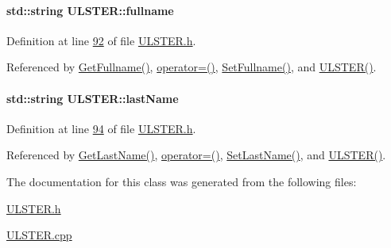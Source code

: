 \paragraph[{\texorpdfstring{fullname}{fullname}}]{\setlength{\rightskip}{0pt plus 5cm}std\+::string U\+L\+S\+T\+E\+R\+::fullname\hspace{0.3cm}{\ttfamily [private]}}\hypertarget{class_u_l_s_t_e_r_a5dc42cbd515825463ba31c8d3dcfe1b6_a5dc42cbd515825463ba31c8d3dcfe1b6}{}\label{class_u_l_s_t_e_r_a5dc42cbd515825463ba31c8d3dcfe1b6_a5dc42cbd515825463ba31c8d3dcfe1b6}


Definition at line \hyperlink{_u_l_s_t_e_r_8h_source_l00092}{92} of file \hyperlink{_u_l_s_t_e_r_8h_source}{U\+L\+S\+T\+E\+R.\+h}.



Referenced by \hyperlink{_u_l_s_t_e_r_8cpp_source_l00102}{Get\+Fullname()}, \hyperlink{_u_l_s_t_e_r_8h_source_l00062}{operator=()}, \hyperlink{_u_l_s_t_e_r_8cpp_source_l00098}{Set\+Fullname()}, and \hyperlink{_u_l_s_t_e_r_8h_source_l00024}{U\+L\+S\+T\+E\+R()}.

\paragraph[{\texorpdfstring{last\+Name}{lastName}}]{\setlength{\rightskip}{0pt plus 5cm}std\+::string U\+L\+S\+T\+E\+R\+::last\+Name\hspace{0.3cm}{\ttfamily [private]}}\hypertarget{class_u_l_s_t_e_r_afa319e559a6a7653aa67e6d8f801d7ee_afa319e559a6a7653aa67e6d8f801d7ee}{}\label{class_u_l_s_t_e_r_afa319e559a6a7653aa67e6d8f801d7ee_afa319e559a6a7653aa67e6d8f801d7ee}


Definition at line \hyperlink{_u_l_s_t_e_r_8h_source_l00094}{94} of file \hyperlink{_u_l_s_t_e_r_8h_source}{U\+L\+S\+T\+E\+R.\+h}.



Referenced by \hyperlink{_u_l_s_t_e_r_8cpp_source_l00086}{Get\+Last\+Name()}, \hyperlink{_u_l_s_t_e_r_8h_source_l00062}{operator=()}, \hyperlink{_u_l_s_t_e_r_8cpp_source_l00082}{Set\+Last\+Name()}, and \hyperlink{_u_l_s_t_e_r_8h_source_l00024}{U\+L\+S\+T\+E\+R()}.



The documentation for this class was generated from the following files\+:\begin{DoxyCompactItemize}
\item 
\hyperlink{_u_l_s_t_e_r_8h}{U\+L\+S\+T\+E\+R.\+h}\item 
\hyperlink{_u_l_s_t_e_r_8cpp}{U\+L\+S\+T\+E\+R.\+cpp}\end{DoxyCompactItemize}
